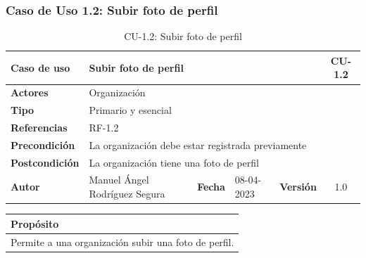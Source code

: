 \subsubsection{Caso de Uso 1.2: Subir foto de perfil}\label{subsubsec:subir-foto-perfil}

\begin{table}[H]
    \begin{center}
        \begin{adjustbox}{width=\textwidth}
            \begin{tabular}{ | l | l | l | l | c | c | }
                \hline
                \textbf{Caso de uso} & \multicolumn{4}{l|}{Subir foto de perfil} & \cellcolor{gray!50} \textbf{CU-1.2}\\
                \hline
                \textbf{Actores} & \multicolumn{5}{p{0.5\linewidth}|}{Organización} \\
                \hline
                \textbf{Tipo} & \multicolumn{5}{l|}{Primario y esencial} \\
                \hline
                \textbf{Referencias} & \multicolumn{3}{l|}{RF-1.2} & \multicolumn{2}{l|}{ }\\
                \hline
                \textbf{Precondición} & \multicolumn{5}{l|}{La organización debe estar registrada previamente} \\
                \hline
                \textbf{Postcondición} & \multicolumn{5}{l|}{La organización tiene una foto de perfil} \\
                \hline
                \textbf{Autor} & \multicolumn{1}{p{0.25\linewidth}|}{Manuel Ángel Rodríguez Segura} & \textbf{Fecha} &
                08-04-2023     & \textbf{Versión}                                                      & 1.0\\
                \hline
            \end{tabular}
        \end{adjustbox}
        \caption{CU-1.2: Subir foto de perfil}
        \label{tab:subir-foto-perfil}
    \end{center}
\end{table}

\begin{table}[H]
    \centering
    \begin{tabularx}{\textwidth}{@{} |L |@{}} \hline
        \textbf{Propósito} \\
        \hline
        Permite a una organización subir una foto de perfil. \\
        \hline
    \end{tabularx}
\end{table}

